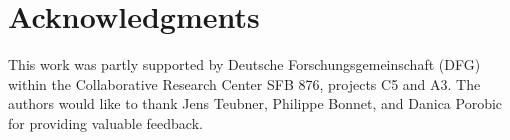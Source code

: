 \documentclass[11pt,dvipdfm]{article}
\begin{document}

\section*{Acknowledgments}
This work was partly supported by Deutsche Forschungsgemeinschaft (DFG) 
within the Collaborative Research Center SFB 876, projects C5 and A3.
The authors would like to thank Jens Teubner, Philippe Bonnet, and Danica Porobic for providing valuable feedback.
\end{document}
